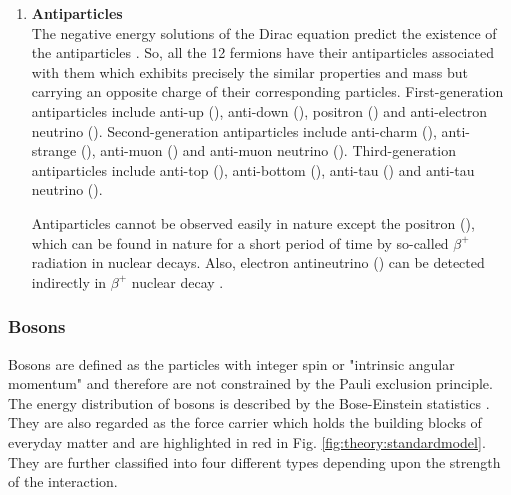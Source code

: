 \begin{enumerate}
	\item \textbf{Antiparticles} \label{sec:theory:standardmodel:fundamentalparticles:fermion:antiparticles}
	\\The negative energy solutions of the Dirac equation predict the existence of the antiparticles \cite{thomson}. So, all the \num{12} fermions have their antiparticles associated with them which exhibits precisely the similar properties and mass but carrying an opposite charge of their corresponding particles. First-generation antiparticles include anti-up (\APup), anti-down (\APdown), positron (\APelectron) and anti-electron neutrino (\APnue). Second-generation antiparticles include anti-charm (\APcharm), anti-strange (\APstrange), anti-muon (\APmuon) and anti-muon neutrino (\APnum). Third-generation antiparticles include anti-top (\APtop), anti-bottom (\APbottom), anti-tau (\APtauon) and anti-tau neutrino (\APnut).
	
	Antiparticles cannot be observed easily in nature except the positron (\APelectron), which can be found in nature for a short period of time by so-called $\beta^{+}$ radiation in nuclear decays. Also, electron antineutrino (\APnue) can be detected indirectly in $\beta^{+}$ nuclear decay \cite{thesis:tanja}.
	
\end{enumerate}

\subsubsection{Bosons}%
\label{sec:theory:standardmodel:fundamentalparticles:bosons}

Bosons are defined as the particles with integer spin or "intrinsic angular momentum" and therefore are not constrained by the Pauli exclusion principle. The energy distribution of bosons is described by the Bose-Einstein statistics \cite{thomson}. They are also regarded as the force carrier which holds the building blocks of everyday matter and are highlighted in red in Fig. \ref{fig:theory:standardmodel}. They are further classified into four different types depending upon the strength of the interaction.

